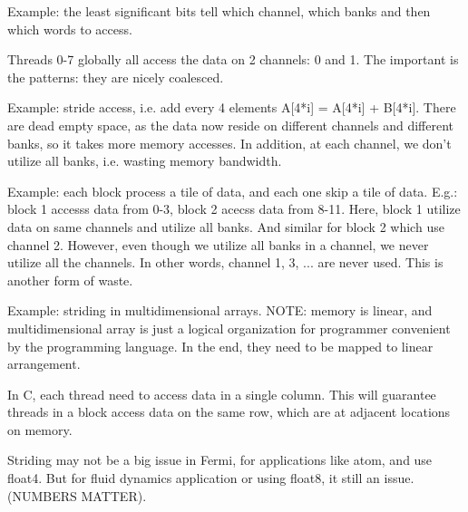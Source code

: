 Example: the least significant bits tell which channel, which banks
and then which words to access.

Threads 0-7 globally all access the data on 2 channels: 0 and 1. The
important is the patterns: they are nicely coalesced. 


Example: stride access, i.e. add every 4 elements A[4*i] = A[4*i] +
B[4*i]. There are dead empty space, as the data now reside on
different channels and different banks, so it takes more memory
accesses. In addition, at each channel, we don't utilize all banks,
i.e. wasting memory bandwidth. 


Example: each block process a tile of data, and each one skip a tile
of data. E.g.: block 1 accesss data from 0-3, block 2 acecss data from
8-11. Here, block 1 utilize data on same channels and utilize all
banks. And similar for block 2 which use channel 2. However, even
though we utilize all banks in a channel, we never utilize all the
channels. In other words, channel 1, 3, ... are never used. This is
another form of waste. 


Example: striding in multidimensional arrays. NOTE: memory is linear,
and multidimensional array is just a logical organization for
programmer convenient by the programming language. In the end, they
need to be mapped to linear arrangement. 

In C, each thread need to access data in a single column. This will
guarantee threads in a block access data on the same row, which are
at adjacent locations on memory. 

\begin{framed}
  Striding may not be a big issue in Fermi, for applications like
  atom, and use float4. But for fluid dynamics application or using
  float8, it still an issue. (NUMBERS MATTER).
\end{framed}

